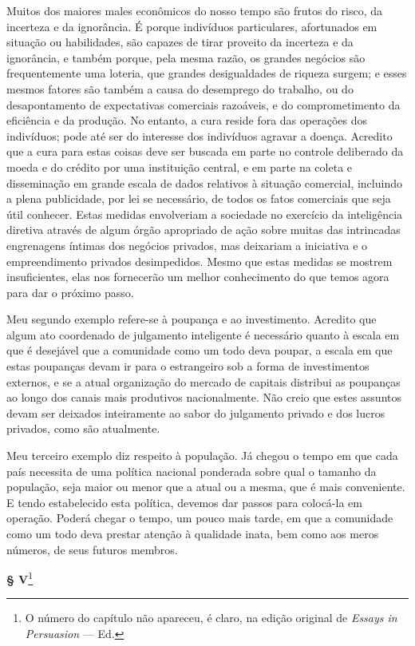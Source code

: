 \documentclass[12pt]{article}
\begin{document}
Muitos dos maiores males econômicos do nosso tempo são frutos do risco, da incerteza e da ignorância. É porque indivíduos particulares, afortunados em situação ou habilidades, são capazes de tirar proveito da incerteza e da ignorância, e também porque, pela mesma razão, os grandes negócios são frequentemente uma loteria, que grandes desigualdades de riqueza surgem; e esses mesmos fatores são também a causa do desemprego do trabalho, ou do desapontamento de expectativas comerciais razoáveis, e do comprometimento da eficiência e da produção. No entanto, a cura reside fora das operações dos indivíduos; pode até ser do interesse dos indivíduos agravar a doença. Acredito que a cura para estas coisas deve ser buscada em parte no controle deliberado da moeda e do crédito por uma instituição central, e em parte na coleta e disseminação em grande escala de dados relativos à situação comercial, incluindo a plena publicidade, por lei se necessário, de todos os fatos comerciais que seja útil conhecer. Estas medidas envolveriam a sociedade no exercício da inteligência diretiva através de algum órgão apropriado de ação sobre muitas das intrincadas engrenagens íntimas dos negócios privados, mas deixariam a iniciativa e o empreendimento privados desimpedidos. Mesmo que estas medidas se mostrem insuficientes, elas nos fornecerão um melhor conhecimento do que temos agora para dar o próximo passo.

Meu segundo exemplo refere-se à poupança e ao investimento. Acredito que algum ato coordenado de julgamento inteligente é necessário quanto à escala em que é desejável que a comunidade como um todo deva poupar, a escala em que estas poupanças devam ir para o estrangeiro sob a forma de investimentos externos, e se a atual organização do mercado de capitais distribui as poupanças ao longo dos canais mais produtivos nacionalmente. Não creio que estes assuntos devam ser deixados inteiramente ao sabor do julgamento privado e dos lucros privados, como são atualmente.

Meu terceiro exemplo diz respeito à população. Já chegou o tempo em que cada país necessita de uma política nacional ponderada sobre qual o tamanho da população, seja maior ou menor que a atual ou a mesma, que é mais conveniente. E tendo estabelecido esta política, devemos dar passos para colocá-la em operação. Poderá chegar o tempo, um pouco mais tarde, em que a comunidade como um todo deva prestar atenção à qualidade inata, bem como aos meros números, de seus futuros membros.

\begin{center}
\textbf{§ V}\footnote{O número do capítulo não apareceu, é claro, na edição original de \textit{Essays in Persuasion} — Ed.}
\end{center}
\end{document}
